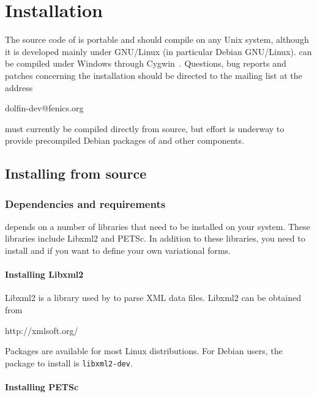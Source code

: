 \chapter{Installation}
\label{app:installation}

The source code of \dolfin{} is portable and should compile on any
Unix system, although it is developed mainly under GNU/Linux (in 
particular Debian GNU/Linux). \dolfin{} can be compiled under Windows
through Cygwin~\cite{www:Cygwin}. Questions, bug reports and patches
concerning the installation should be directed to the \dolfin{} mailing 
list at the address
\begin{code}
  dolfin-dev@fenics.org
\end{code}

\dolfin{} must currently be compiled directly from source, but effort
is underway to provide precompiled Debian packages of \dolfin{} and
other \fenics{} components.

\section{Installing from source}

\subsection{Dependencies and requirements}

\dolfin{} depends on a number of libraries that need to be installed on your
system. These libraries include Libxml2 and PETSc. In addition to these 
libraries, you need to install \fiat{} and \ffc{} if you want to define your 
own variational forms.

\subsubsection{Installing Libxml2}

Libxml2 is a library used by \dolfin{} to parse XML data files. Libxml2 can be
obtained from
\begin{code}
  http://xmlsoft.org/
\end{code}
Packages are available for most Linux distributions. For Debian users, the 
package to install is \texttt{libxml2-dev}.

\subsubsection{Installing PETSc}

